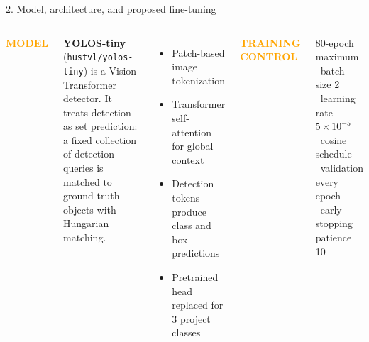 \documentclass[aspectratio=169,11pt]{beamer}
\newcommand{\tagline}[1]{\textcolor{orange}{\small\bfseries #1}}
\begin{document}
\begin{frame}{2. Model, architecture, and proposed fine-tuning}
  \begin{columns}[T]
    \tagline{MODEL}\par\vspace{0.05cm}
    \textbf{YOLOS-tiny} (\texttt{hustvl/yolos-tiny}) is a Vision Transformer detector. It treats detection as set prediction: a fixed collection of detection queries is matched to ground-truth objects with Hungarian matching.
    \vspace{0.16cm}
    \begin{itemize}\setlength\itemsep{1pt}\small
      \item Patch-based image tokenization
      \item Transformer self-attention for global context
      \item Detection tokens produce class and box predictions
      \item Pretrained head replaced for 3 project classes
    \end{itemize}
    \vspace{0.1cm}
    \tagline{TRAINING CONTROL}\par
    \scriptsize 80-epoch maximum \textbullet\ batch size 2 \textbullet\ learning rate $5\times10^{-5}$ \textbullet\ cosine schedule \textbullet\ validation every epoch \textbullet\ early stopping patience 10


\end{columns}
\end{frame}
\end{document}
